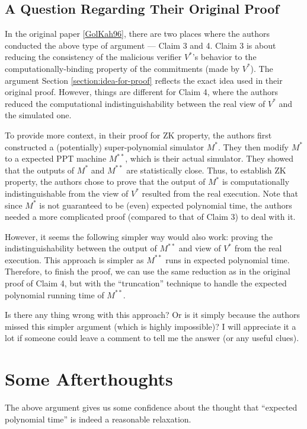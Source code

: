 \documentclass{article}
\begin{document}
\subsection{A Question Regarding Their Original Proof}
In the original paper [\href{http://www.wisdom.weizmann.ac.il/~oded/PSX/zkAK.pdf}{GolKah96}], there are two places where the authors conducted the above type of argument --- Claim 3 and 4. Claim 3 is about reducing the consistency of the malicious verifier $V^*$'s behavior to the computationally-binding property of the commitments (made by $V^*$). The argument Section \ref{section:idea-for-proof} reflects the exact idea used in their original proof. However, things are different for Claim 4, where the authors reduced the computational indistinguishability between the real view of $V^*$ and the simulated one.

To provide more context, in their proof for ZK property, the authors first constructed a (potentially) super-polynomial simulator $M^*$. They then modify $M^*$ to a expected PPT machine $M^{**}$, which is their actual simulator. They showed that the outputs of $M^*$ and $M^{**}$ are statistically close. Thus, to establish ZK property, the authors chose to prove that the output of $M^*$ is computationally indistinguishable from the view of $V^*$ resulted from the real execution. Note that since $M^*$ is not guaranteed to be (even) expected polynomial time, the authors needed a more complicated proof (compared to that of Claim 3) to deal with it.

However, it seems the following simpler way would also work: proving the indistinguishability between the output of $M^{**}$ and view of $V^*$ from the real execution. This approach is simpler as $M^{**}$ runs in expected polynomial time. Therefore, to finish the proof, we can use the same reduction as in the original proof of Claim 4, but with the ``truncation'' technique to handle the expected polynomial running time of $M^{**}$.

Is there any thing wrong with this approach? Or is it simply because the authors missed this simpler argument (which is highly impossible)? I will appreciate it a lot if someone could leave a comment to tell me the answer (or any useful clues). 

\section{Some Afterthoughts}
The above argument gives us some confidence about the thought that ``expected polynomial time'' is indeed a reasonable relaxation. 
\end{document}
